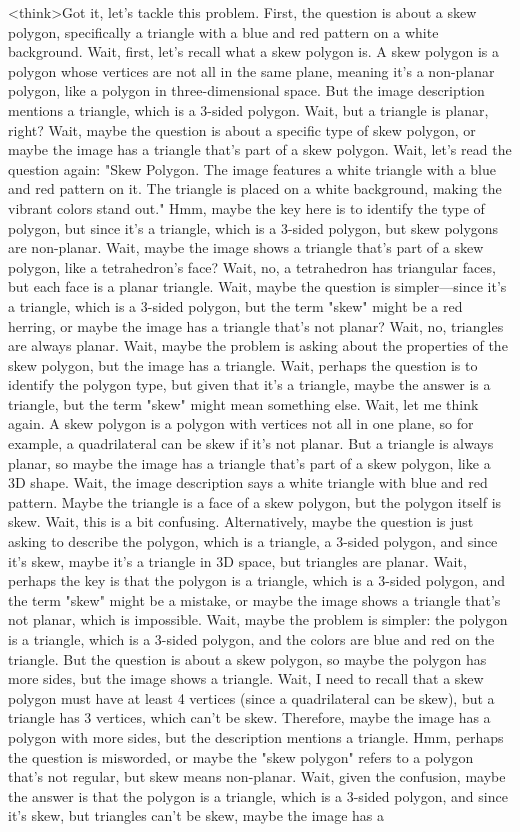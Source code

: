 <think>Got it, let's tackle this problem. First, the question is about a skew polygon, specifically a triangle with a blue and red pattern on a white background. Wait, first, let's recall what a skew polygon is. A skew polygon is a polygon whose vertices are not all in the same plane, meaning it's a non-planar polygon, like a polygon in three-dimensional space. But the image description mentions a triangle, which is a 3-sided polygon. Wait, but a triangle is planar, right? Wait, maybe the question is about a specific type of skew polygon, or maybe the image has a triangle that's part of a skew polygon. Wait, let's read the question again: "Skew Polygon. The image features a white triangle with a blue and red pattern on it. The triangle is placed on a white background, making the vibrant colors stand out." Hmm, maybe the key here is to identify the type of polygon, but since it's a triangle, which is a 3-sided polygon, but skew polygons are non-planar. Wait, maybe the image shows a triangle that's part of a skew polygon, like a tetrahedron's face? Wait, no, a tetrahedron has triangular faces, but each face is a planar triangle. Wait, maybe the question is simpler—since it's a triangle, which is a 3-sided polygon, but the term "skew" might be a red herring, or maybe the image has a triangle that's not planar? Wait, no, triangles are always planar. Wait, maybe the problem is asking about the properties of the skew polygon, but the image has a triangle. Wait, perhaps the question is to identify the polygon type, but given that it's a triangle, maybe the answer is a triangle, but the term "skew" might mean something else. Wait, let me think again. A skew polygon is a polygon with vertices not all in one plane, so for example, a quadrilateral can be skew if it's not planar. But a triangle is always planar, so maybe the image has a triangle that's part of a skew polygon, like a 3D shape. Wait, the image description says a white triangle with blue and red pattern. Maybe the triangle is a face of a skew polygon, but the polygon itself is skew. Wait, this is a bit confusing. Alternatively, maybe the question is just asking to describe the polygon, which is a triangle, a 3-sided polygon, and since it's skew, maybe it's a triangle in 3D space, but triangles are planar. Wait, perhaps the key is that the polygon is a triangle, which is a 3-sided polygon, and the term "skew" might be a mistake, or maybe the image shows a triangle that's not planar, which is impossible. Wait, maybe the problem is simpler: the polygon is a triangle, which is a 3-sided polygon, and the colors are blue and red on the triangle. But the question is about a skew polygon, so maybe the polygon has more sides, but the image shows a triangle. Wait, I need to recall that a skew polygon must have at least 4 vertices (since a quadrilateral can be skew), but a triangle has 3 vertices, which can't be skew. Therefore, maybe the image has a polygon with more sides, but the description mentions a triangle. Hmm, perhaps the question is misworded, or maybe the "skew polygon" refers to a polygon that's not regular, but skew means non-planar. Wait, given the confusion, maybe the answer is that the polygon is a triangle, which is a 3-sided polygon, and since it's skew, but triangles can't be skew, maybe the image has a 